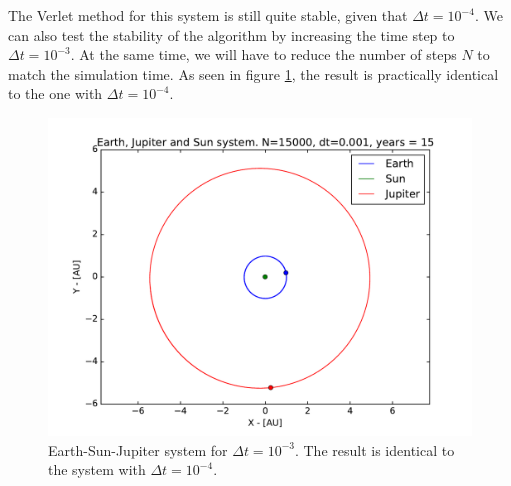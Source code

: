 \documentclass[12pt]{article}
\begin{document}
The Verlet method for this system is still quite stable, given that $\Delta t = 10^{-4}$. We can also test the stability of the algorithm by increasing the time step to $\Delta t = 10^{-3}$. At the same time, we will have to reduce the number of steps $N$ to match the simulation time. As seen in figure \ref{fig:ESJ_stability}, the result is practically identical to the one with $\Delta t = 10^{-4}$.

\begin{figure}[!h]
\centering
\includegraphics[width=\linewidth]{Plots/Earth_Sun_Jupiter_largerdt.pdf}
\caption{Earth-Sun-Jupiter system for $\Delta t = 10^{-3}$. The result is identical to the system with $\Delta t = 10^{-4}$.}
\label{fig:ESJ_stability}
\end{figure}
\end{document}
